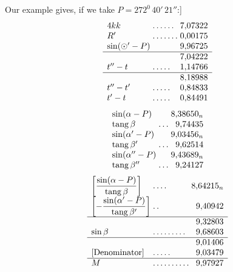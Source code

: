 Our example gives, if we take \(P=272^{0}\,40'\,21''\):]
\[
\begin{array}{l@{\;}l@{\;}r}
4kk&\mathord{.}\,\mathord{.}\,\mathord{.}\,\mathord{.}\,\mathord{.}\,\mathord{.}&7{,}07322\\
R'&\mathord{.}\,\mathord{.}\,\mathord{.}\,\mathord{.}\,\mathord{.}\,\mathord{.}\,\mathord{.}&0{,}00175\\
\sin(\odot'-P)&&9{,}96725\\\hline
&&7{,}04222\\
t''-t&\mathord{.}\,\mathord{.}\,\mathord{.}\,\mathord{.}\,\mathord{.}&1{,}14766\\\hline
&&8{,}18988\\
t''-t'&\mathord{.}\,\mathord{.}\,\mathord{.}\,\mathord{.}\,\mathord{.}&0{,}84833\\
t'-t&\mathord{.}\,\mathord{.}\,\mathord{.}\,\mathord{.}\,\mathord{.}&0{,}84491
\end{array}
\]
\[
\begin{array}{l@{\;}l@{\;}r}
\sin(\alpha-P)&&8{,}38650_n\\
\operatorname{tang}\beta&\mathord{.}\,\mathord{.}\,\mathord{.}&9{,}74435\\
\sin(\alpha'-P)&&9{,}03456_n\\
\operatorname{tang}\beta'&\mathord{.}\,\mathord{.}\,\mathord{.}&9{,}62514\\
\sin(\alpha''-P)&&9{,}43689_n\\
\operatorname{tang}\beta''&\mathord{.}\,\mathord{.}\,\mathord{.}&9{,}24127
\end{array}
\]
\[
\begin{array}{l@{\;}l@{\;}r}
\left[\dfrac{\sin(\alpha-P)}{\operatorname{tang}\beta}\right]&\mathord{.}\,\mathord{.}\,\mathord{.}\,\mathord{.}&8{,}64215_n\\[3pt]
\left[-\dfrac{\sin(\alpha'-P)}{\operatorname{tang}\beta'}\right]&\mathord{.}\,\mathord{.}&9{,}40942\\[3pt]\hline
&&9{,}32803\\
\sin\beta&\mathord{.}\,\mathord{.}\,\mathord{.}\,\mathord{.}\,\mathord{.}\,\mathord{.}\,\mathord{.}\,\mathord{.}\,\mathord{.}&9{,}68603\\\hline
&&9{,}01406\\
{}[\text{Denominator}]&\mathord{.}\,\mathord{.}\,\mathord{.}\,\mathord{.}\,\mathord{.}&9{,}03479\\\hline
M&\mathord{.}\,\mathord{.}\,\mathord{.}\,\mathord{.}\,\mathord{.}\,\mathord{.}\,\mathord{.}\,\mathord{.}\,\mathord{.}\,\mathord{.}&9{,}97927
\end{array}
\]
